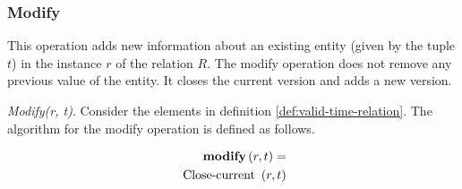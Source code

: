\subsubsection{\label{subsubsec:modify}Modify}
This operation adds new information about an existing entity (given by the tuple $t$) in the instance $r$ of the relation $R$. The modify operation does not remove any previous value of the entity. It closes the current version and adds a new version.



\begin{definition}
 \emph{Modify(r, t)}.
Consider the elements in definition \ref{def:valid-time-relation}. The algorithm for the modify operation is defined as follows.
\end{definition}


\begin{align}
\label{eq:modify}
\MOD \left( r, t\right) =\\
\nonumber
\mbox{ Close-current }\left(r, t\right) %
\end{align}



